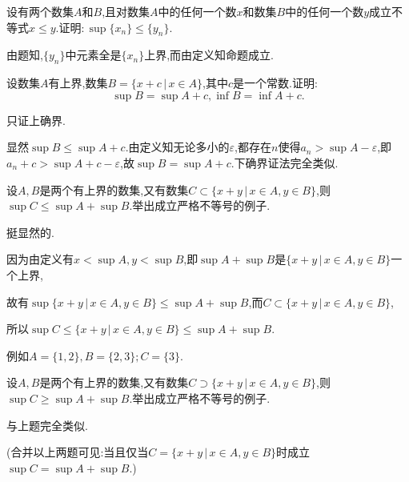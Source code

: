      \begin{exercise}
         设有两个数集$A$和$B$,且对数集$A$中的任何一个数$x$和数集$B$中的任何一个数$y$成立不等式$x\leqslant y$.证明:\,$\sup\{x_n\}\leqslant\{y_n\}$.
     \end{exercise}
     \begin{solution}
         由题知,$\{y_n\}$中元素全是$\{x_n\}$上界,而由定义知命题成立.
     \end{solution}

     \begin{exercise}
         设数集$A$有上界,数集$B=\{x+c\,\lvert\, x\in A\}$,其中$c$是一个常数.证明:\,
         \[
             \sup B=\sup A+c,\inf B=\inf A+c.
         \]
     \end{exercise}
     \begin{solution}
         只证上确界.

         显然$\sup B\leqslant\sup A+c$.由定义知无论多小的$\varepsilon$,都存在$n$使得$a_n>\sup A-\varepsilon$,即$a_n+c>\sup A+c-\varepsilon$,故$\sup B=\sup A+c$.下确界证法完全类似.
     \end{solution}

     \begin{exercise}
         设$A,B$是两个有上界的数集,又有数集$C\subset \{x+y\,\lvert\, x\in A,y\in B\}$,则$\sup C\leqslant \sup A+\sup B$.举出成立严格不等号的例子.
     \end{exercise}
     \begin{solution}
         挺显然的.

         因为由定义有$x<\sup A,y<\sup B$,即$\sup A+\sup B$是$\{x+y\,\lvert\,x\in A,y\in B\}$一个上界,

         故有$\sup \{x+y\,\lvert\,x\in A,y\in B\}\leqslant\sup A+\sup B$,而$C\subset \{x+y\,\lvert\,x\in A,y\in B\}$,

         所以$\sup C\leqslant \{x+y\,\lvert\,x\in A,y\in B\}\leqslant\sup A+\sup B$.

         例如$A=\{1,2\},B=\{2,3\};C=\{3\}$.
     \end{solution}

     \begin{exercise}
         设$A,B$是两个有上界的数集,又有数集$C\supset  \{x+y\,\lvert\, x\in A,y\in B\}$,则$\sup C\geqslant \sup A+\sup B$.举出成立严格不等号的例子.
     \end{exercise}
     \begin{solution}
         与上题完全类似.
     \end{solution}
     \begin{note}
         (合并以上两题可见:当且仅当$C=\{x+y\,\lvert\, x\in A,y\in B\}$时成立$\sup C=\sup A+\sup B$.)
     \end{note}
